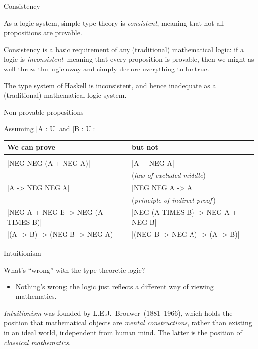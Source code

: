 \documentclass[t,compress,hyperref={hidelinks}]{beamer}
\begin{document}
\begin{frame}{Consistency}

As a logic system, simple type theory is \emph{consistent}, meaning that not all propositions are provable.

Consistency is a basic requirement of any (traditional) mathematical logic: if a logic is \emph{inconsistent}, meaning that every proposition is provable, then we might as well throw the logic away and simply declare everything to be true.

The type system of Haskell is inconsistent, and hence inadequate as a (traditional) mathematical logic system.

\end{frame}

\begin{frame}{Non-provable propositions}

Assuming |A : U| and |B : U|:
\begin{center}
\begin{tabular}{ll}
We can prove & but not \\ \hline \\[-2ex]
|NEG NEG (A + NEG A)| & |A + NEG A| \\
& (\emph{law of excluded middle}) \\
|A -> NEG NEG A| & |NEG NEG A -> A| \\
& (\emph{principle of indirect proof}\,) \\
|NEG A + NEG B -> NEG (A TIMES B)| & |NEG (A TIMES B) -> NEG A + NEG B| \\
|(A -> B) -> (NEG B -> NEG A)| & |(NEG B -> NEG A) -> (A -> B)|
\end{tabular}
\end{center}

\end{frame}

\begin{frame}{Intuitionism}

What's ``wrong'' with the type-theoretic logic?
\begin{itemize}
\item Nothing's wrong; the logic just reflects a different way of viewing mathematics.
\end{itemize}

\emph{Intuitionism} was founded by L.E.J.~Brouwer~(1881--1966), which holds the position that mathematical objects are \emph{mental constructions}, rather than existing in an ideal world, independent from human mind.
The latter is the position of \emph{classical mathematics}.

\end{frame}
\end{document}
